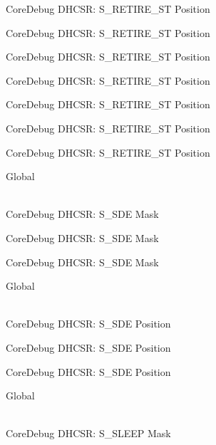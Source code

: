 \begin{DoxyRefList}
\label{deprecated__deprecated000111}%
%
Core\+Debug DHCSR\+: S\+\_\+\+RETIRE\+\_\+\+ST Position 

\label{deprecated__deprecated000165}%
%
Core\+Debug DHCSR\+: S\+\_\+\+RETIRE\+\_\+\+ST Position 

\label{deprecated__deprecated000250}%
%
Core\+Debug DHCSR\+: S\+\_\+\+RETIRE\+\_\+\+ST Position 

\label{deprecated__deprecated000307}%
%
Core\+Debug DHCSR\+: S\+\_\+\+RETIRE\+\_\+\+ST Position 

\label{deprecated__deprecated000383}%
%
Core\+Debug DHCSR\+: S\+\_\+\+RETIRE\+\_\+\+ST Position 

\label{deprecated__deprecated000462}%
%
Core\+Debug DHCSR\+: S\+\_\+\+RETIRE\+\_\+\+ST Position 

\label{deprecated__deprecated000564}%
%
Core\+Debug DHCSR\+: S\+\_\+\+RETIRE\+\_\+\+ST Position  
\item[{\parbox[t]{\linewidth}{Global \doxylink{group___c_m_s_i_s___s_c_b_ga67f2b2b6729ab2db89f97bbe75224e9d}{Core\+Debug\+\_\+\+DHCSR\+\_\+\+S\+\_\+\+SDE\+\_\+\+Msk} }}]\hfill \\
\label{deprecated__deprecated000020}%
%
Core\+Debug DHCSR\+: S\+\_\+\+SDE Mask 

\label{deprecated__deprecated000471}%
%
Core\+Debug DHCSR\+: S\+\_\+\+SDE Mask 

\label{deprecated__deprecated000573}%
%
Core\+Debug DHCSR\+: S\+\_\+\+SDE Mask  
\item[{\parbox[t]{\linewidth}{Global \doxylink{group___c_m_s_i_s___s_c_b_ga34b00f5a0109d236647be6609d6f04b3}{Core\+Debug\+\_\+\+DHCSR\+\_\+\+S\+\_\+\+SDE\+\_\+\+Pos} }}]\hfill \\
\label{deprecated__deprecated000019}%
%
Core\+Debug DHCSR\+: S\+\_\+\+SDE Position 

\label{deprecated__deprecated000470}%
%
Core\+Debug DHCSR\+: S\+\_\+\+SDE Position 

\label{deprecated__deprecated000572}%
%
Core\+Debug DHCSR\+: S\+\_\+\+SDE Position  
\item[{\parbox[t]{\linewidth}{Global \doxylink{group___c_m_s_i_s___core_debug_ga98d51538e645c2c1a422279cd85a0a25}{Core\+Debug\+\_\+\+DHCSR\+\_\+\+S\+\_\+\+SLEEP\+\_\+\+Msk} }}]\hfill \\
\label{deprecated__deprecated000024}%
%
Core\+Debug DHCSR\+: S\+\_\+\+SLEEP Mask 


\end{DoxyRefList}
